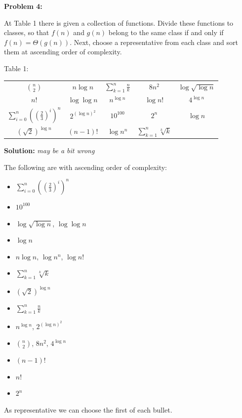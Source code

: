 \documentclass[12pt]{article}
\begin{document}
\begin{center}
\textbf{Problem 4:}
\end{center}
At Table 1 there is given a collection of functions. Divide these functions to classes, so that $f(n)$ and $g(n)$ belong to the same class if and only if $f(n) = \Theta(g(n))$. Next, choose a representative from each class and sort them at ascending order of complexity.
\begin{center}
Table 1:
\end{center}


\begin{center}
\begin{tabular}{c c c c c}

${n\choose 2}$ & $n\log n$ & $\sum_{k=1}^{n} \frac{n}{k}$ & $8n^2$ & $\log \sqrt{\log n}$ \\
$n!$ & $\log \log n$ & $n^{\log n}$ & $\log n!$ & $4^{\log n}$ \\
$\sum_{i=0}^{n} ((\frac{2}{3})^i)^n$ & $2^{(\log n)^2}$ & $10^{100}$ & $2^n$ & $\log n$ \\
$(\sqrt{2})^{\log n}$ & $(n-1)!$ & $\log n^n$ & $\sum_{k=1}^{n} \sqrt[k]{k}$
\end{tabular}
\end{center}

\begin{center}
\textbf{Solution:} \textit{may be a bit wrong}
\end{center}
The following are with ascending order of complexity:
\begin{itemize}
\item $\sum_{i=0}^{n} ((\frac{2}{3})^i)^n$
\item $10^{100}$
\item $\log \sqrt{\log n}$, $\log \log n$
\item $\log n$
\item $n\log n$, $\log n^n$, $\log n!$
\item $\sum_{k=1}^{n} \sqrt[k]{k}$
\item $(\sqrt{2})^{\log n}$
\item $\sum_{k=1}^{n} \frac{n}{k}$
\item $n^{\log n}$, $2^{(\log n)^2}$
\item ${n\choose 2}$, $8n^2$, $4^{\log n}$
\item $(n-1)!$
\item $n!$
\item $2^n$
\end{itemize}
As representative we can choose the first of each bullet.
\end{document}
